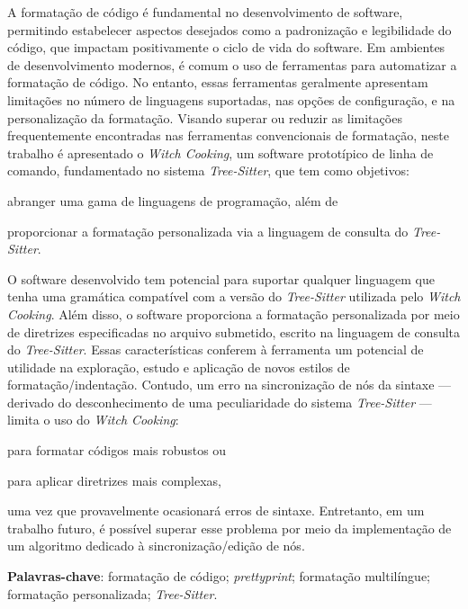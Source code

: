 \documentclass
  [11pt,a4paper,english,brazil,openright,sumario=tradicional,twoside]
  {abntex2}
\newcommand{\treesitter}{\textit{Tree-Sitter}\xspace}
\newcommand{\witchcooking}{\textit{Witch Cooking}\xspace}
\begin{document}
  \begin{resumo}
    A formatação de código é fundamental no desenvolvimento de software,
    permitindo estabelecer aspectos desejados como a padronização e
    legibilidade do código, que impactam positivamente o ciclo de vida do
    software. Em ambientes de desenvolvimento modernos, é comum o uso de
    ferramentas para automatizar a formatação de código. No entanto, essas
    ferramentas geralmente apresentam limitações no número de linguagens
    suportadas, nas opções de configuração, e na personalização da formatação.
    Visando superar ou reduzir as limitações frequentemente encontradas nas
    ferramentas convencionais de formatação, neste trabalho é apresentado o
    \witchcooking, um software prototípico de linha de comando, fundamentado no
    sistema \treesitter, que tem como objetivos:
    \begin{inparaenum}
      \item abranger uma gama de linguagens de programação, além de
      \item proporcionar a formatação personalizada via a linguagem de consulta
            do \treesitter.
    \end{inparaenum}
    O software desenvolvido tem potencial para suportar qualquer linguagem que
    tenha uma gramática compatível com a versão do \treesitter utilizada pelo
    \witchcooking. Além disso, o software proporciona a formatação
    personalizada por meio de diretrizes especificadas no arquivo submetido,
    escrito na linguagem de consulta do \treesitter. Essas características
    conferem à ferramenta um potencial de utilidade na exploração, estudo e
    aplicação de novos estilos de formatação/indentação. Contudo, um erro na
    sincronização de nós da sintaxe --- derivado do desconhecimento de uma
    peculiaridade do sistema \treesitter{} --- limita o uso do \witchcooking:
    \begin{inparaenum}
      \item para formatar códigos mais robustos ou
      \item para aplicar diretrizes mais complexas,
    \end{inparaenum}
    uma vez que provavelmente ocasionará erros de sintaxe. Entretanto, em um
    trabalho futuro, é possível superar esse problema por meio da implementação
    de um algoritmo dedicado à sincronização/edição de nós.

    \noindent
    \textbf{Palavras-chave}:
    formatação de código;
    \textit{prettyprint};
    formatação multilíngue;
    formatação personalizada;
    \treesitter.
  \end{resumo}
\end{document}
